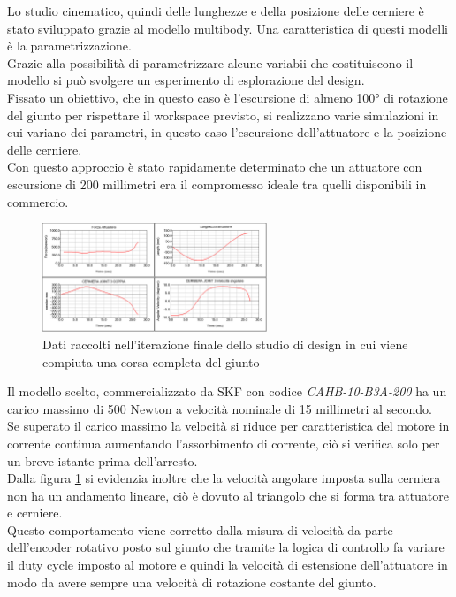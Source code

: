 \documentclass[%
corpo=11pt,
twoside,
 stile=classica,
oldstyle,
greek,%
]{toptesi}
\begin{document}
	Lo studio cinematico, quindi delle lunghezze e della posizione delle cerniere è stato sviluppato grazie al modello multibody. Una caratteristica di questi modelli è la parametrizzazione.\\
	 Grazie alla possibilità di parametrizzare alcune variabii che costituiscono il modello si può svolgere un esperimento di esplorazione del design. \\
	Fissato un obiettivo, che in questo caso è l'escursione di almeno 100° di rotazione del giunto per rispettare il workspace previsto, si realizzano varie simulazioni in cui variano dei parametri, in questo caso l'escursione dell'attuatore e la posizione delle cerniere. \\
	Con questo approccio è stato rapidamente determinato che un attuatore con escursione di 200 millimetri era il compromesso ideale tra quelli disponibili in commercio. 
	\begin{figure}
		\centering
		\includegraphics[width=0.6\textwidth]{Plots/GOMITO/Joint3.png}
		\caption{Dati raccolti nell'iterazione finale dello studio di design in cui viene compiuta una corsa completa del giunto }
		\label{fig:MBDLinear}
	\end{figure}
	Il modello scelto, commercializzato da SKF con codice \textit{CAHB-10-B3A-200} ha un carico massimo di 500 Newton a velocità nominale di 15 millimetri al secondo. \\
	Se superato il carico massimo la velocità si riduce per caratteristica del motore in corrente continua aumentando l'assorbimento di corrente, ciò si verifica solo per un breve istante prima dell'arresto.\\
	 Dalla figura \ref{fig:MBDLinear} si evidenzia inoltre che la velocità angolare imposta sulla cerniera non ha un andamento lineare, ciò è dovuto al triangolo che si forma tra attuatore e cerniere. \\
	Questo comportamento viene corretto dalla misura di velocità da parte dell'encoder rotativo posto sul giunto che tramite la logica di controllo fa variare il duty cycle imposto al motore e quindi la velocità di estensione dell'attuatore in modo da avere sempre una velocità di rotazione costante del giunto. 
	
\end{document}

